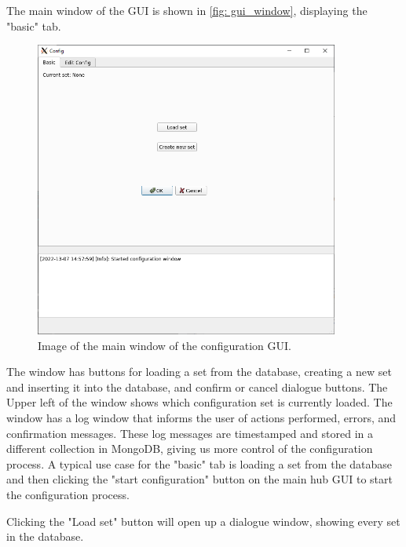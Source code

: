 \documentclass[main.tex]{subfiles}
\begin{document}
The main window of the GUI is shown in \autoref{fig: gui_window}, displaying the "basic" tab.

\begin{figure}[!ht]
    \centering
    \includegraphics[width=10cm, scale=1.5]{images/gui_main.png}
    \caption{Image of the main window of the configuration GUI.}
    \label{fig: gui_window}
\end{figure}
\FloatBarrier

The window has buttons for loading a set from the database, creating a new set and inserting it into the database, and confirm or cancel dialogue buttons. The Upper left of the window shows which configuration set is currently loaded. The window has a log window that informs the user of actions performed, errors, and confirmation messages. These log messages are timestamped and stored in a different collection in MongoDB, giving us more control of the configuration process. A typical use case for the "basic" tab is loading a set from the database and then clicking the "start configuration" button on the main hub GUI to start the configuration process.

Clicking the "Load set" button will open up a dialogue window, showing every set in the database.
\end{document}
